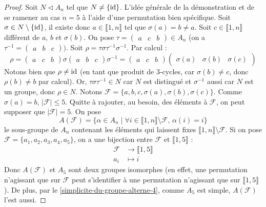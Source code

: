   \begin{proof}
    Soit $N \lhd A_n$ tel que $N \neq \{ \operatorname{id} \}$. L'idée générale de la démonstration et de se ramener au cas $n = 5$ à l'aide d'une permutation bien spécifique.
    \newpar
    Soit $\sigma \in N \setminus \{ \operatorname{id} \}$, il existe donc $a \in \llbracket 1, n \rrbracket$ tel que $\sigma(a) = b \neq a$. Soit $c \in \llbracket 1, n \rrbracket$ différent de $a$, $b$ et $\sigma(b)$. On pose $\tau = \begin{pmatrix} a & c & b \end{pmatrix} \in A_n$ (on a $\tau^{-1} = \begin{pmatrix} a & b & c \end{pmatrix})$. Soit $\rho = \tau \sigma \tau^{-1} \sigma^{-1}$. Par calcul :
    \[ \rho = \begin{pmatrix} a & c & b \end{pmatrix} \sigma \begin{pmatrix} a & b & c \end{pmatrix} \sigma^{-1} = \begin{pmatrix} a & c & b \end{pmatrix} \begin{pmatrix} \sigma(a) & \sigma(b) & \sigma(c) \end{pmatrix} \]
    Notons bien que $\rho \neq \operatorname{id}$ (en tant que produit de $3$-cycles, car $\sigma(b) \neq c$, donc $\rho(b) \neq b$ par calcul). Or, $\tau \sigma \tau^{-1} \in N$ car $N$ est distingué et $\sigma^{-1}$ aussi car $N$ est un groupe, donc $\rho \in N$.
    \newpar
    Notons $\mathcal{F} = \{ a, b, c, \sigma(a), \sigma(b), \sigma(c) \}$. Comme $\sigma(a) = b$, $|\mathcal{F}| \leq 5$. Quitte à rajouter, au besoin, des éléments à $\mathcal{F}$, on peut supposer que $|\mathcal{F}| = 5$. On pose
    \[ A(\mathcal{F}) = \{ \alpha \in A_n \mid \forall i \in \llbracket 1, n \rrbracket \setminus \mathcal{F}, \, \alpha(i) = i \} \]
    le sous-groupe de $A_n$ contenant les éléments qui laissent fixes $\llbracket 1, n \rrbracket \setminus \mathcal{F}$. Si on pose $\mathcal{F} = \{ a_1, a_2, a_3, a_4, a_5 \}$, on a une bijection entre $\mathcal{F}$ et $\llbracket 1, 5 \rrbracket$ :
    \begin{align*}
      \mathcal{F} &\rightarrow \llbracket 1, 5 \rrbracket \\
      a_i &\mapsto i
    \end{align*}
    Donc $A(\mathcal{F})$ et $A_5$ sont deux groupes isomorphes (en effet, une permutation n'agissant que sur $\mathcal{F}$ peut s'identifier à une permutation n'agissant que sur $\llbracket 1, 5 \rrbracket$). De plus, par le \cref{simplicite-du-groupe-alterne-4}, comme $A_5$ est simple, $A(\mathcal{F})$ l'est aussi.

\end{proof}
